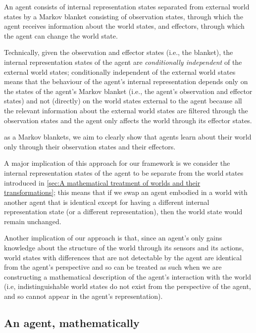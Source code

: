 \begin{postulate}
	An agent consists of internal representation states separated from external world states by a Markov blanket consisting of observation states, through which the agent receives information about the world states, and effectors, through which the agent can change the world state.
\end{postulate}

Technically, given the observation and effector states (i.e., the blanket), the internal representation states of the agent are \emph{conditionally independent} of the external world states; conditionally independent of the external world states means that the behaviour of the agent's internal representation depends only on the states of the agent's Markov blanket (i.e., the agent's observation and effector states) and not (directly) on the world states external to the agent because all the relevant information about the external world states are filtered through the observation states and the agent only affects the world through its effector states.

 as a Markov blankets, we aim to clearly show that agents learn about their world only through their observation states and their effectors.

A major implication of this approach for our framework is we consider the internal representation states of the agent to be separate from the world states introduced in \cref{sec:A mathematical treatment of worlds and their transformations}; this means that if we swap an agent embodied in a world with another agent that is identical except for having a different internal representation state (or a different representation), then the world state would remain unchanged.

Another implication of our approach is that, since an agent's only gains knowledge about the structure of the world through its sensors and its actions, world states with differences that are not detectable by the agent are identical from the agent's perspective and so can be treated as such when we are constructing a mathematical description of the agent's interaction with the world (i.e, indistinguishable world states do not exist from the perspective of the agent, and so cannot appear in the agent's representation).

\subsection{An agent, mathematically}

